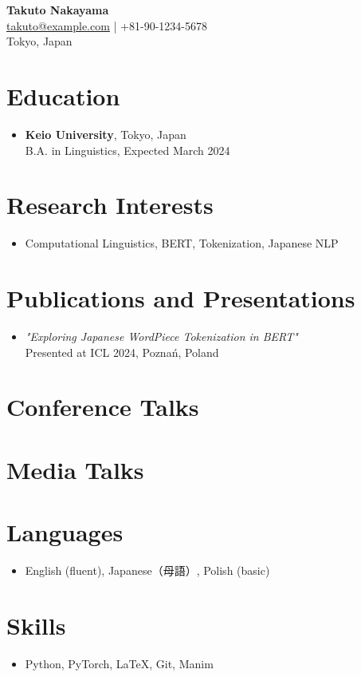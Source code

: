 \documentclass[a4paper,11pt]{article}
\begin{document}
\begin{center}
    {\LARGE \textbf{Takuto Nakayama}}\\
    \vspace{0.5em}
    \href{mailto:takuto@example.com}{takuto@example.com} \quad | \quad +81-90-1234-5678 \\
    \vspace{0.2em}
    Tokyo, Japan
\end{center}

\vspace{1em}

\section*{Education}
\begin{itemize}[leftmargin=*]
  \item \textbf{Keio University}, Tokyo, Japan \\
  B.A. in Linguistics, Expected March 2024
\end{itemize}

\section*{Research Interests}
\begin{itemize}[leftmargin=*]
  \item Computational Linguistics, BERT, Tokenization, Japanese NLP
\end{itemize}

\section*{Publications and Presentations}
\begin{itemize}[leftmargin=*]
  \item \textit{"Exploring Japanese WordPiece Tokenization in BERT"} \\
        Presented at ICL 2024, Poznań, Poland
\end{itemize}

\section*{Conference Talks}


\section*{Media Talks}



\section*{Languages}
\begin{itemize}[leftmargin=*]
  \item English (fluent), Japanese（母語）, Polish (basic)
\end{itemize}

\section*{Skills}
\begin{itemize}[leftmargin=*]
  \item Python, PyTorch, LaTeX, Git, Manim
\end{itemize}
\end{document}
